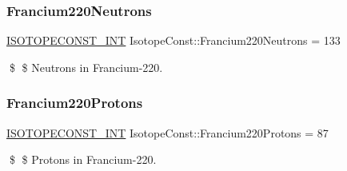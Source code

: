 \subsubsection{\texorpdfstring{Francium220\+Neutrons}{Francium220Neutrons}}
{\footnotesize\ttfamily \mbox{\hyperlink{group___isotope_const-_macros_ga5f18360b3e99483a35c32d789e62621c}{I\+S\+O\+T\+O\+P\+E\+C\+O\+N\+S\+T\+\_\+\+I\+NT}} Isotope\+Const\+::\+Francium220\+Neutrons = 133}

\$ \$ Neutrons in Francium-\/220. \mbox{\label{group___isotope_const-_francium-_fr220_ga71babe8ce9a5d5ef56a05eca9a4a43fa}} 
\subsubsection{\texorpdfstring{Francium220\+Protons}{Francium220Protons}}
{\footnotesize\ttfamily \mbox{\hyperlink{group___isotope_const-_macros_ga5f18360b3e99483a35c32d789e62621c}{I\+S\+O\+T\+O\+P\+E\+C\+O\+N\+S\+T\+\_\+\+I\+NT}} Isotope\+Const\+::\+Francium220\+Protons = 87}

\$ \$ Protons in Francium-\/220. 